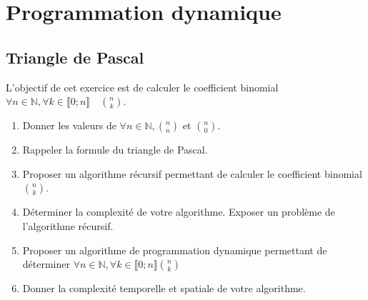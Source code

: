 \documentclass[border=10pt,preview]{standalone}
\newif\ifcorrection
\begin{document}
\section{Programmation dynamique}

\subsection{Triangle de Pascal}

L'objectif de cet exercice est de calculer le coefficient binomial $\forall n \in \mathbb{N}, \forall k \in \llbracket 0; n \rrbracket \quad \binom{n}{k}$.
\begin{enumerate}
    \item Donner les valeurs de $\forall n \in \mathbb{N}, \binom{n}{n}$ et $\binom{n}{0}$.
    \item Rappeler la formule du triangle de Pascal.
    \item Proposer un algorithme récursif permettant de calculer le coefficient binomial $\binom{n}{k}$.
    \item Déterminer la complexité de votre algorithme. Exposer un problème de l'algorithme récursif.
    \item Proposer un algorithme de programmation dynamique permettant de déterminer $\forall n \in \mathbb{N}, \forall k \in \llbracket 0; n \rrbracket \binom{n}{k}$
    \item Donner la complexité temporelle et spatiale de votre algorithme.
\end{enumerate}


\ifcorrection
\end{document}
